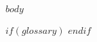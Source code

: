 \documentclass{scrbook} %
\begin{document}
	
	
	\ifisbook\cleardoubleemptypage\fi

    \setcounter{tocdepth}{2}
	\tableofcontents
	\cleardoublepage

    $body$

    \listoffigures
    $if(glossary)$
    \printnoidxglossary
    $endif$
    
	\ifisbook\pagestyle{plain}\cleardoubleemptypage\fi
\end{document}

